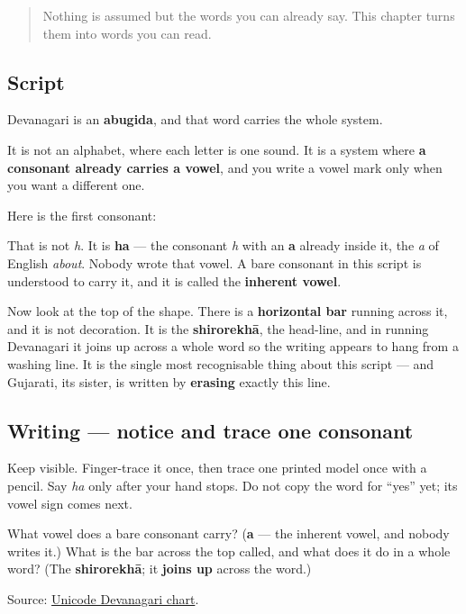 \begin{quote}
Nothing is assumed but the words you can already say. This chapter turns them into words you can read.
\end{quote}

\subsection*{Script}
Devanagari is an \textbf{abugida}, and that word carries the whole system.

It is not an alphabet, where each letter is one sound. It is a system where \textbf{a consonant already carries a vowel}, and you write a vowel mark only when you want a different one.

Here is the first consonant:

\begin{quote}
\end{quote}

That is not \emph{h}. It is \textbf{ha} — the consonant \emph{h} with an \textbf{a} already inside it, the \emph{a} of English \emph{about}. Nobody wrote that vowel. A bare consonant in this script is understood to carry it, and it is called the \textbf{inherent vowel}.

Now look at the top of the shape. There is a \textbf{horizontal bar} running across it, and it is not decoration. It is the \textbf{shirorekhā}, the head-line, and in running Devanagari it joins up across a whole word so the writing appears to hang from a washing line. It is the single most recognisable thing about this script — and Gujarati, its sister, is written by \textbf{erasing} exactly this line.

\subsection*{Writing — notice and trace one consonant}

Keep \textbf{} visible. Finger-trace it once, then trace one printed model once with a pencil. Say \emph{ha} only after your hand stops. Do not copy the word for \textquotedblleft{}yes\textquotedblright{} yet; its vowel sign comes next.

\begin{tcolorbox}[breakable,colback=teal!4,colframe=teal!35!black,title={Before you move on}]
What vowel does a bare consonant carry? (\textbf{a} — the inherent vowel, and nobody writes it.) What is the bar across the top called, and what does it do in a whole word? (The \textbf{shirorekhā}; it \textbf{joins up} across the word.)

Source: \href{https://www.unicode.org/charts/PDF/U0900.pdf}{Unicode Devanagari chart}.
\end{tcolorbox}
